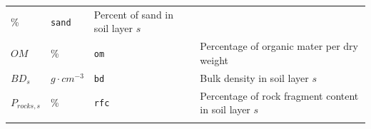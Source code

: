 \documentclass[]{book}
\begin{document}
\begin{longtable}[]{@{}llll@{}}
\begin{minipage}[t]{0.10\columnwidth}
\%\strut
\end{minipage} & \begin{minipage}[t]{0.12\columnwidth}\raggedright
\texttt{sand}\strut
\end{minipage} & \begin{minipage}[t]{0.45\columnwidth}\raggedright
Percent of sand in soil layer \(s\)\strut
\end{minipage}\tabularnewline
\begin{minipage}[t]{0.11\columnwidth}\raggedright
\(OM\)\strut
\end{minipage} & \begin{minipage}[t]{0.10\columnwidth}\raggedright
\%\strut
\end{minipage} & \begin{minipage}[t]{0.12\columnwidth}\raggedright
\texttt{om}\strut
\end{minipage} & \begin{minipage}[t]{0.45\columnwidth}\raggedright
Percentage of organic mater per dry weight\strut
\end{minipage}\tabularnewline
\begin{minipage}[t]{0.11\columnwidth}\raggedright
\(BD_{s}\)\strut
\end{minipage} & \begin{minipage}[t]{0.10\columnwidth}\raggedright
\(g\cdot cm^{-3}\)\strut
\end{minipage} & \begin{minipage}[t]{0.12\columnwidth}\raggedright
\texttt{bd}\strut
\end{minipage} & \begin{minipage}[t]{0.45\columnwidth}\raggedright
Bulk density in soil layer \(s\)\strut
\end{minipage}\tabularnewline
\begin{minipage}[t]{0.11\columnwidth}\raggedright
\(P_{rocks,s}\)\strut
\end{minipage} & \begin{minipage}[t]{0.10\columnwidth}\raggedright
\%\strut
\end{minipage} & \begin{minipage}[t]{0.12\columnwidth}\raggedright
\texttt{rfc}\strut
\end{minipage} & \begin{minipage}[t]{0.45\columnwidth}\raggedright
Percentage of rock fragment content in soil layer \(s\)\strut
\end{minipage}\tabularnewline
\begin{minipage}[t]{0.11\columnwidth}\raggedright

\end{minipage}
\end{longtable}
\end{document}
